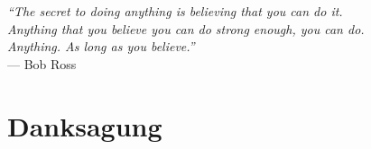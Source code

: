 
\begin{flushright}{\slshape    
    “The secret to doing anything is believing that you can do it.\\
    Anything that you believe you can do strong enough, you can do.\\
    Anything. As long as you believe.”} \\ \medskip
    --- Bob Ross \cite{The Joy of Painting}
\end{flushright}

\bigskip

\begingroup
	\let\clearpage\relax
	\let\cleardoublepage\relax
	\let\cleardoublepage\relax
	\chapter*{Danksagung}


\endgroup

